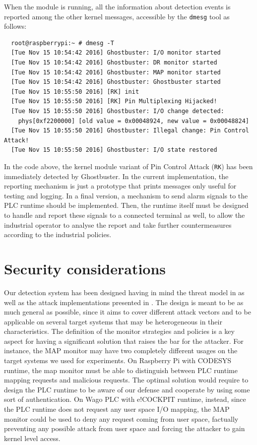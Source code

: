 When the module is running, all the information about detection events is reported among the other kernel messages, accessible by the \verb|dmesg| tool as follows:
\begin{Verbatim}
  root@raspberrypi:~ # dmesg -T
  [Tue Nov 15 10:54:42 2016] Ghostbuster: I/O monitor started
  [Tue Nov 15 10:54:42 2016] Ghostbuster: DR monitor started
  [Tue Nov 15 10:54:42 2016] Ghostbuster: MAP monitor started
  [Tue Nov 15 10:54:42 2016] Ghostbuster: Ghostbuster started
  [Tue Nov 15 10:55:50 2016] [RK] init
  [Tue Nov 15 10:55:50 2016] [RK] Pin Multiplexing Hijacked!
  [Tue Nov 15 10:55:50 2016] Ghostbuster: I/O change detected:
	phys[0xf2200000] [old value = 0x00048924, new value = 0x00048824]
  [Tue Nov 15 10:55:50 2016] Ghostbuster: Illegal change: Pin Control Attack!
  [Tue Nov 15 10:55:50 2016] Ghostbuster: I/O state restored
\end{Verbatim}
In the code above, the kernel module variant of Pin Control Attack (\verb|RK|) has been immediately detected by Ghostbuster.
In the current implementation, the reporting mechanism is just a prototype that prints messages only useful for testing and logging.
In a final version, a mechanism to send alarm signals to the PLC runtime should be implemented.
Then, the runtime itself must be designed to handle and report these signals to a connected terminal as well,
to allow the industrial operator to analyse the report and take further countermeasures according to the industrial policies.


\section{Security considerations}
\label{sec:def-sec}

Our detection system has been designed having in mind the threat model in  as well as the attack implementations presented in .
The design is meant to be as much general as possible, since it aims to cover different attack vectors and to be applicable
on several target systems that may be heterogeneous in their characteristics.
The definition of the monitor strategies and policies is a key aspect for having a significant solution that raises the bar for the attacker.
For instance, the MAP monitor may have two completely different usages on the target systems we used for experiments.
On Raspberry Pi with CODESYS runtime, the map monitor must be able to distinguish between PLC runtime mapping requests and malicious requests.
The optimal solution would require to design the PLC runtime to be aware of our defense and cooperate by using some sort of authentication.
On Wago PLC with e!COCKPIT runtime, instead, since the PLC runtime does not request any user space I/O mapping, the MAP monitor could be used to deny
any request coming from user space, factually preventing any possible attack from user space and forcing the attacker to gain kernel level access.

